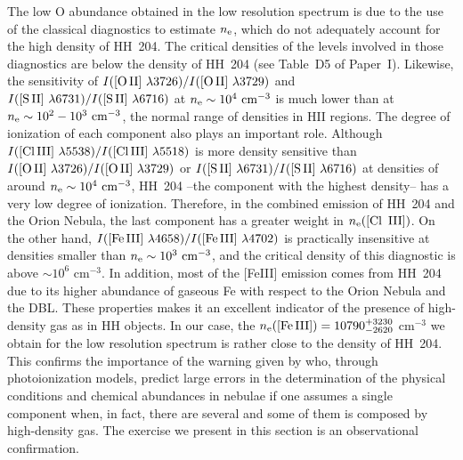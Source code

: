 \documentclass[twocolumn,linenumbers]{aastex63}
\begin{document}
The low O abundance obtained in the low resolution spectrum is due to the use of the classical diagnostics to estimate $n_{\rm e}$, which do not adequately account for the high density of HH~204. The critical densities of the levels involved in those diagnostics are below the density of HH~204 (see Table~D5 of Paper~I). Likewise, the sensitivity of $I(\text{[O\thinspace II] } \lambda 3726)/I(\text{[O\thinspace II] } \lambda 3729)$ and $I(\text{[S\thinspace II] } \lambda 6731)/I(\text{[S\thinspace II] } \lambda 6716)$ at $n_{\rm e} \sim 10^4 \text{ cm}^{-3}$ is much lower than at $n_{\rm e} \sim 10^2 - 10^3 \text{ cm}^{-3}$, the normal range of densities in H\thinspace II regions. The degree of ionization of each component also plays an important role. Although $I(\text{[Cl\thinspace III] } \lambda 5538)/I(\text{[Cl\thinspace III] } \lambda 5518)$ is more density sensitive than $I(\text{[O\thinspace II] } \lambda 3726)/I(\text{[O\thinspace II] } \lambda 3729)$ or $I(\text{[S\thinspace II] } \lambda 6731)/I(\text{[S\thinspace II] } \lambda 6716)$ at densities of around $n_{\rm e}\sim 10^{4} \text{ cm}^{-3}$, HH~204 --the component with the highest density-- has a very low degree of ionization. Therefore, in the combined emission of HH~204 and the Orion Nebula, the last  component has a greater weight in $n_{\rm e}(\text{[Cl \thinspace III]})$. On the other hand, $I(\text{[Fe\thinspace III] } \lambda 4658)/I(\text{[Fe\thinspace III] } \lambda 4702)$ is practically insensitive at densities smaller than $n_{\rm e}\sim 10^{3}\text{ cm}^{-3}$, and the critical density of this diagnostic is above $\sim 10^{6}\text{ cm}^{-3}$. In addition, most of the [Fe\thinspace III] emission comes from HH~204 due to its higher abundance of gaseous Fe with respect to the Orion Nebula and the DBL. These properties makes it an excellent indicator of the presence of high-density gas as in HH objects. In our case, the $n_{\rm e}(\text{[Fe\thinspace III]})=10790^{+3230} _{-2620}$  cm$^{-3}$ we obtain for the low resolution spectrum is rather close to the density of HH~204. This confirms the importance of the warning given by \citet{Morisset17} who, through photoionization models, predict large errors in the determination of the physical conditions and chemical abundances in nebulae if one assumes a single component when, in fact, there are several and some of them is composed by high-density gas. The exercise we present in this section is an observational confirmation.
\end{document}
